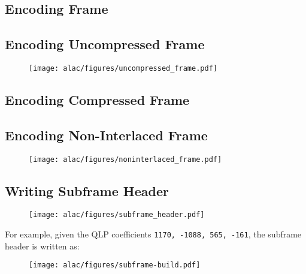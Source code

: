 \clearpage

\subsection{Encoding Frame}
\label{alac:encode_frame}
{
  
}

\clearpage

\subsection{Encoding Uncompressed Frame}
\label{alac:write_uncompressed_frame}
{
  
}

\begin{figure}[h]
  \texttt{[image: alac/figures/uncompressed\_frame.pdf]}
\end{figure}

\clearpage

\subsection{Encoding Compressed Frame}
\label{alac:write_compressed_frame}
{
  
}

\clearpage

\subsection{Encoding Non-Interlaced Frame}
\label{alac:write_non_interlaced_frame}
{
  
}
\begin{figure}[h]
  \texttt{[image: alac/figures/noninterlaced\_frame.pdf]}
\end{figure}

\clearpage

\subsection{Writing Subframe Header}
\label{alac:write_subframe_header}

\begin{figure}[h]
\texttt{[image: alac/figures/subframe\_header.pdf]}
\end{figure}
\par
\noindent
For example, given the QLP coefficients
\texttt{1170, -1088, 565, -161},
the subframe header is written as:
\begin{figure}[h]
\texttt{[image: alac/figures/subframe-build.pdf]}
\end{figure}

